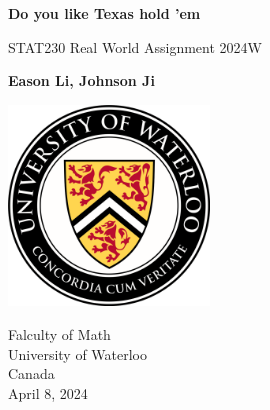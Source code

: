 \documentclass{article}
\begin{document}
\begin{titlepage}
    \begin{center}
        \vspace*{0.6cm}
            
        \Huge
        \textbf{Do you like Texas hold 'em}
            
        \vspace{0.5cm}
        \LARGE
        STAT230 Real World Assignment 2024W
            
        \vspace{1.5cm}
            
        \textbf{Eason Li, Johnson Ji}
            
        \vspace{3.6cm}
        
        \begin{center}
            \includegraphics[width = 0.4\textwidth]{UofLoo.png}
        \end{center}

        \vspace{0.4cm}
            
        \Large
        Falculty of Math \\
        University of Waterloo \\
        Canada \\
        April 8, 2024
    \end{center}
\end{titlepage}

\newpage
\end{document}
